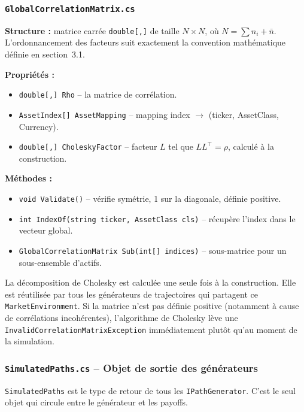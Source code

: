 \documentclass[a4paper,11pt]{article}
\newcommand{\cs}[1]{\texttt{\color{codeinline}#1}}
\begin{document}
\subsubsection{\texttt{GlobalCorrelationMatrix.cs}}

\textbf{Structure :} matrice carr\'ee \cs{double[,]} de taille $N \times N$, o\`u $N = \sum n_i + \bar{n}$.
L'ordonnancement des facteurs suit exactement la convention math\'ematique d\'efinie
en section~3.1.

\textbf{Propri\'et\'es :}
\begin{itemize}[leftmargin=1.5em]
  \item \cs{double[,] Rho} -- la matrice de corr\'elation.
  \item \cs{AssetIndex[] AssetMapping} -- mapping index $\to$ (ticker, AssetClass, Currency).
  \item \cs{double[,] CholeskyFactor} -- facteur $L$ tel que $LL^\top = \rho$, calcul\'e \`a la construction.
\end{itemize}

\textbf{M\'ethodes :}
\begin{itemize}[leftmargin=1.5em]
  \item \cs{void Validate()} -- v\'erifie sym\'etrie, 1 sur la diagonale, d\'efinie positive.
  \item \cs{int IndexOf(string ticker, AssetClass cls)} -- r\'ecup\`ere l'index dans le vecteur global.
  \item \cs{GlobalCorrelationMatrix Sub(int[] indices)} -- sous-matrice pour un sous-ensemble d'actifs.
\end{itemize}

\begin{tcolorbox}[note]
La d\'ecomposition de Cholesky est calcul\'ee une seule fois \`a la construction. Elle est
r\'eutilis\'ee par tous les g\'en\'erateurs de trajectoires qui partagent ce \cs{MarketEnvironment}.
Si la matrice n'est pas d\'efinie positive (notamment \`a cause de corr\'elations incoh\'erentes),
l'algorithme de Cholesky l\`eve une \cs{InvalidCorrelationMatrixException} imm\'ediatement
plut\^ot qu'au moment de la simulation.
\end{tcolorbox}

\subsubsection{\texttt{SimulatedPaths.cs} -- Objet de sortie des g\'en\'erateurs}

\cs{SimulatedPaths} est le type de retour de tous les \cs{IPathGenerator}. C'est le
seul objet qui circule entre le g\'en\'erateur et les payoffs.
\end{document}

